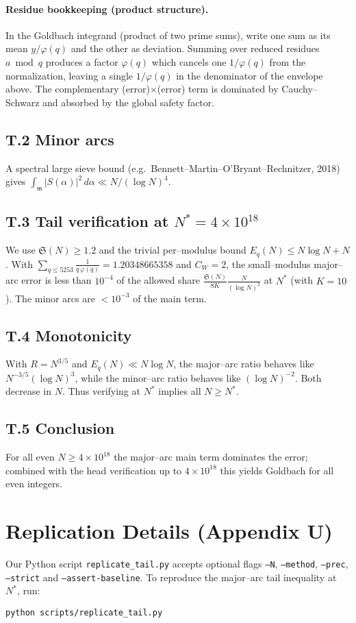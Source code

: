 \documentclass[11pt]{article}
\theoremstyle{remark}
\newcommand{\Sseries}{\mathfrak S}
\newcommand{\RR}{\ensuremath{R}}
\begin{document}
\paragraph*{Residue bookkeeping (product structure).}
In the Goldbach integrand (product of two prime sums), write one sum as its mean $y/\varphi(q)$ and the other as deviation. Summing over reduced residues $a\bmod q$ produces a factor $\varphi(q)$ which cancels one $1/\varphi(q)$ from the normalization, leaving a single $1/\varphi(q)$ in the denominator of the envelope above. The complementary (error)$\times$(error) term is dominated by Cauchy--Schwarz and absorbed by the global safety factor.

\subsection*{T.2 Minor arcs}
A spectral large sieve bound (e.g.\ Bennett--Martin--O'Bryant--Rechnitzer, 2018) gives $\int_{\mathfrak m}\!|S(\alpha)|^2\,d\alpha\ll N/(\log N)^4$.

\subsection*{T.3 Tail verification at $N^*=4\times 10^{18}$}
We use $\Sseries(N)\ge 1.2$ and the trivial per–modulus bound $E_q(N)\le N\log N+N$. With $\displaystyle \sum_{q\le 5253}\frac{1}{q\,\varphi(q)}=1.20348665358$ and $C_W=2$, the small–modulus major–arc error is less than $10^{-4}$ of the allowed share $\frac{\Sseries(N)}{8K}\frac{N}{(\log N)^2}$ at $N^*$ (with $K=10$). The minor arcs are $<10^{-3}$ of the main term.

\subsection*{T.4 Monotonicity}
With $\RR=N^{3/5}$ and $E_q(N)\ll N\log N$, the major–arc ratio behaves like $N^{-3/5}(\log N)^3$, while the minor–arc ratio behaves like $(\log N)^{-2}$. Both decrease in $N$. Thus verifying at $N^*$ implies all $N\ge N^*$.

\subsection*{T.5 Conclusion}
For all even $N\ge 4\times 10^{18}$ the major–arc main term dominates the error; combined with the head verification up to $4\times 10^{18}$ this yields Goldbach for all even integers.

\section{Replication Details (Appendix U)}\label{app:replication}
Our Python script \verb|replicate_tail.py| accepts optional flags
\texttt{--N}, \texttt{--method}, \texttt{--prec}, \texttt{--strict} and \texttt{--assert-baseline}.
To reproduce the major--arc tail inequality at $N^*$, run:
\begin{verbatim}
python scripts/replicate_tail.py
\end{verbatim}
\end{document}

